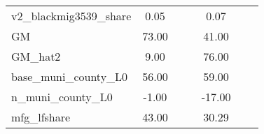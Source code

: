 \begin{table}[htbp]
\begin{tabular}{l*{2}{ccc}}
v2\_blackmig3539\_share&        0.05&            &            &        0.07&            &            \\
GM                  &       73.00&            &            &       41.00&            &            \\
GM\_hat2             &        9.00&            &            &       76.00&            &            \\
base\_muni\_county\_L0 &       56.00&            &            &       59.00&            &            \\
n\_muni\_county\_L0    &       -1.00&            &            &      -17.00&            &            \\
mfg\_lfshare         &       43.00&            &            &       30.29&            &            \\
\bottomrule
\end{tabular}
\end{table}
